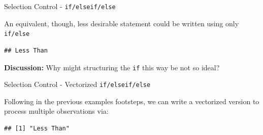 \begin{frame}[fragile]{Selection Control - \texttt{if/elseif/else}}

An equivalent, though, less desirable statement could be written using
only \texttt{if/else}

\begin{Shaded}
\begin{Highlighting}[]
\StringTok{ }
\StringTok{ }\NormalTok{) \{}
  \NormalTok{(}\NormalTok{)}
  \StringTok{ }\NormalTok{)\{}
    \NormalTok{(}\NormalTok{)}
    \NormalTok{(}\NormalTok{)}
  \NormalTok{\}}
\NormalTok{\}}
\end{Highlighting}
\end{Shaded}

\begin{verbatim}
## Less Than
\end{verbatim}

\textbf{Discussion:} Why might structuring the \texttt{if} this way be
not so ideal?

\end{frame}

\begin{frame}[fragile]{Selection Control - Vectorized
\texttt{if/elseif/else}}

Following in the previous examples footsteps, we can write a vectorized
version to process multiple observations via:

\begin{Shaded}
\begin{Highlighting}[]
\StringTok{ }\NormalTok{, }\NormalTok{, }
       \StringTok{ }\NormalTok{, }\NormalTok{, }\NormalTok{))}
\end{Highlighting}
\end{Shaded}

\begin{verbatim}
## [1] "Less Than"
\end{verbatim}

\end{frame}

